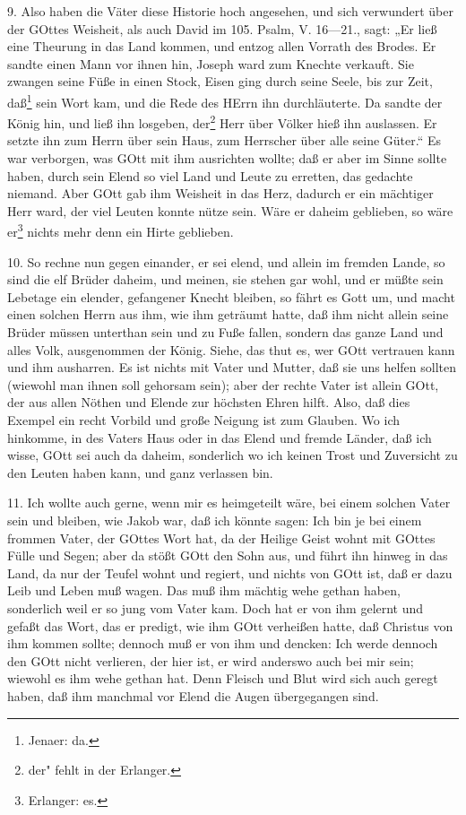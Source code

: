 9. Also haben die Väter diese Historie hoch angesehen, und sich verwundert über der GOttes Weisheit, als auch David im 105. Psalm, V. 16—21., sagt: „Er ließ eine Theurung in das Land kommen, und entzog allen Vorrath des Brodes. Er sandte einen Mann vor ihnen hin, Joseph ward zum Knechte verkauft. Sie zwangen seine Füße in einen Stock, Eisen ging durch seine Seele, bis zur Zeit, daß\footnote{Jenaer: da.} sein Wort kam, und die Rede des HErrn ihn durchläuterte. Da sandte der König hin, und ließ ihn losgeben, der\footnote{der" fehlt in der Erlanger.} Herr über Völker hieß ihn auslassen. Er setzte ihn zum Herrn über sein Haus, zum Herrscher über alle seine Güter.“ Es war verborgen, was GOtt mit ihm ausrichten wollte; daß er aber im Sinne sollte haben, durch sein Elend so viel Land und Leute zu erretten, das gedachte niemand. Aber GOtt gab ihm Weisheit in das Herz, dadurch er ein mächtiger Herr ward, der viel Leuten konnte nütze sein. Wäre er daheim geblieben, so wäre er\footnote{Erlanger: es.} nichts mehr denn ein Hirte geblieben.

10. So rechne nun gegen einander, er sei elend, und allein im fremden Lande, so sind die elf Brüder daheim, und meinen, sie stehen gar wohl, und er müßte sein Lebetage ein elender, gefangener Knecht bleiben, so fährt es Gott um, und macht einen solchen Herrn aus ihm, wie ihm geträumt hatte, daß ihm nicht allein seine Brüder müssen unterthan sein und zu Fuße fallen, sondern das ganze Land und alles Volk, ausgenommen der König. Siehe, das thut es, wer GOtt vertrauen kann und ihm ausharren. Es ist nichts mit Vater und Mutter, daß sie uns
helfen sollten (wiewohl man ihnen soll gehorsam sein); aber der rechte Vater ist allein GOtt, der aus allen Nöthen und Elende zur höchsten Ehren hilft. Also, daß dies Exempel ein recht Vorbild und große Neigung ist zum Glauben. Wo ich hinkomme, in des Vaters Haus oder in das Elend und fremde Länder, daß ich wisse, GOtt sei auch da daheim, sonderlich wo ich keinen Trost und Zuversicht zu den Leuten haben kann, und ganz verlassen bin.

11. Ich wollte auch gerne, wenn mir es heimgeteilt wäre, bei einem solchen Vater sein und bleiben, wie Jakob war, daß ich könnte sagen: Ich bin je bei einem frommen Vater, der GOttes Wort hat, da der Heilige Geist wohnt mit GOttes Fülle und Segen; aber da stößt GOtt den Sohn aus, und führt ihn hinweg in das Land, da nur der Teufel wohnt und regiert, und nichts von GOtt ist, daß er dazu Leib und Leben muß wagen. Das muß ihm mächtig wehe gethan haben, sonderlich weil er so jung vom Vater kam. Doch hat er von ihm gelernt und gefaßt das Wort, das er predigt, wie ihm GOtt verheißen hatte, daß Christus von ihm kommen sollte; dennoch muß er von ihm und dencken: Ich werde dennoch den GOtt nicht verlieren, der hier ist, er wird anderswo auch bei mir sein; wiewohl es ihm wehe gethan hat. Denn Fleisch und Blut wird sich auch geregt haben, daß ihm manchmal vor Elend die Augen übergegangen sind.

